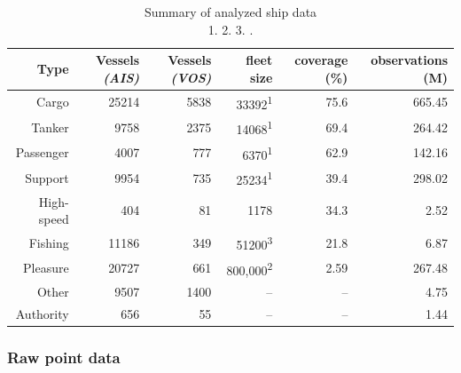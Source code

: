 
\begin{table}[htbp]
  \begin{tabular}{rrrrrr} %
    \hline
    Type & Vessels \textit{(AIS)} & Vessels \textit{(VOS)} & fleet size & coverage (\%) & observations (M) \\
    \hline
    Cargo & 25214 & 5838 & 33392\textsuperscript{1} & 75.6 & 665.45 \\
    Tanker & 9758 & 2375 & 14068\textsuperscript{1} & 69.4 & 264.42 \\
    Passenger & 4007 & 777 & 6370\textsuperscript{1} & 62.9 & 142.16 \\
    Support & 9954 & 735 & 25234\textsuperscript{1} & 39.4 & 298.02 \\
    High-speed & 404 & 81 & 1178 & 34.3 & 2.52 \\
    Fishing & 11186 & 349 & 51200\textsuperscript{3} & 21.8 & 6.87 \\
    Pleasure & 20727 & 661 & 800,000\textsuperscript{2} & 2.59 & 267.48 \\
    Other & 9507 & 1400 & -- & -- & 4.75 \\
    Authority & 656 & 55 & -- & -- & 1.44 \\
  \end{tabular}
  \caption{Summary of analyzed ship data\\
  1. \cite{Equasis2011} 2. \cite{westwood2001global} 3. \cite{FAOfishing}.}
  \label{table:ships-by-type}
\end{table}


\subsubsection{Raw point data}


